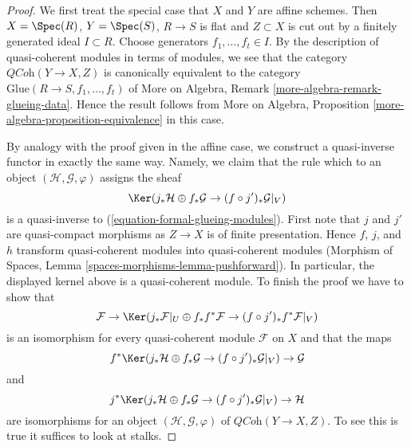 \begin{proof}
We first treat the special case that $X$ and $Y$ are affine schemes.
Then $X = \Spec(R)$, $Y = \Spec(S)$, $R \to S$ is flat and $Z \subset X$
is cut out by a finitely generated ideal $I \subset R$. Choose generators
$f_1, \ldots, f_t \in I$. By the description of quasi-coherent modules
in terms of modules, we see that the category
$\textit{QCoh}(Y \to X, Z)$
is canonically equivalent to the category
$\text{Glue}(R \to S, f_1, \ldots, f_t)$
of More on Algebra, Remark \ref{more-algebra-remark-glueing-data}.
Hence the result follows from
More on Algebra, Proposition \ref{more-algebra-proposition-equivalence}
in this case.

\medskip\noindent
By analogy with the proof given in the affine case, we construct
a quasi-inverse functor in exactly the same way. Namely, we claim
that the rule which to an object $(\mathcal{H}, \mathcal{G}, \varphi)$
assigns the sheaf
$$
\Ker(j_*\mathcal{H} \oplus f_*\mathcal{G} \to (f \circ j')_*\mathcal{G}|_V)
$$
is a quasi-inverse to (\ref{equation-formal-glueing-modules}).
First note that $j$ and $j'$ are quasi-compact morphisms as
$Z \to X$ is of finite presentation. Hence $f$, $j$, and $h$
transform quasi-coherent modules into quasi-coherent modules
(Morphism of Spaces, Lemma \ref{spaces-morphisms-lemma-pushforward}).
In particular, the displayed kernel above is a quasi-coherent module.
To finish the proof we have to show that
$$
\mathcal{F} \to
\Ker(j_*\mathcal{F}|_U \oplus f_*f^*\mathcal{F} \to
(f \circ j')_*f^*\mathcal{F}|_V)
$$
is an isomorphism for every quasi-coherent module $\mathcal{F}$ on $X$
and that the maps
$$
f^*\Ker(j_*\mathcal{H} \oplus f_*\mathcal{G} \to (f \circ j')_*\mathcal{G}|_V)
\to \mathcal{G}
$$
and
$$
j^*\Ker(j_*\mathcal{H} \oplus f_*\mathcal{G} \to (f \circ j')_*\mathcal{G}|_V)
\to \mathcal{H}
$$
are isomorphisms for an object $(\mathcal{H}, \mathcal{G}, \varphi)$
of $\textit{QCoh}(Y \to X, Z)$. To see this is true it suffices to
look at stalks.


\end{proof}
